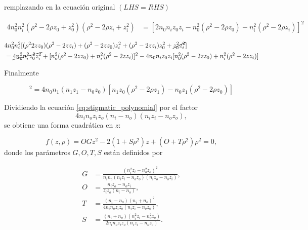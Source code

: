 remplazando en la ecuación original $(LHS = RHS)$


\begin{equation}
\begin{aligned}
4 n_0^2 n_i^2 (\rho^2 - 2\rho z_0 + z_0^2)(\rho^2 - 2\rho z_i + z_i^2)
&= [ 2 n_0 n_i z_0 z_i 
- n_0^2 (\rho^2 - 2\rho z_0)
- n_i^2 (\rho^2 - 2\rho z_i) ]^2
\end{aligned}
\end{equation}

\begin{equation}
\begin{aligned}
&4n_0^2n_i^2[(\rho^2 2zz_0)(\rho^2 - 2zz_i) + (\rho^2 - 2zz_0)z_i^2 + (\rho^2 - 2zz_i)z_0^2 + \cancel{z_0^2z_i^2}  ] 
\\
&= \cancel{4n_0^2n_i^2z_0^2z_i^2} + [n_o^2(\rho^2  - 2zz_0) + n_i^2(\rho^ 2 - 2zz_i)]^2 - 4n_0n_iz_0z_i [n_0^2 (\rho^2 - 2zz_0) + n_i^2(\rho^2 - 2zz_i)]
\end{aligned}
\end{equation}




Finalmente


\begin{equation}
[n_0^2(\rho^2-2\rho z_0) - n_1^2(\rho^2-2\rho z_1)]^2 = 4n_0n_1(n_1z_1-n_0z_0)[n_1z_0(\rho^2-2\rho z_1) - n_0z_1(\rho^2-2\rho z_0)]  
\label{eq:stigmatic_polynomial}
\end{equation}



Dividiendo la ecuación \eqref{eq:stigmatic_polynomial} por el factor
\[
4n_i n_o z_i z_o (n_i - n_o)(n_i z_i - n_o z_o),
\]
se obtiene una forma cuadrática en $z$:

\begin{equation}
f(z, \rho) = O G z^2 - 2(1 + S\rho^2)z + (O + T\rho^2)\rho^2 = 0,
\label{eq:stigmatic_canonical}
\end{equation}
donde los parámetros $G, O, T, S$ están definidos por

\begin{align}
G &= \frac{(n_i^2 z_i - n_o^2 z_o)^2}{n_i n_o (n_i z_i - n_o z_o)(n_i z_o - n_o z_i)}, \label{eq:def_G} \\
O &= \frac{n_i z_o - n_o z_i}{z_i z_o (n_i - n_o)}, \label{eq:def_O} \\
T &= \frac{(n_i - n_o)(n_i + n_o)^2}{4n_i n_o z_i z_o (n_i z_i - n_o z_o)}, \label{eq:def_T} \\
S &= \frac{(n_i + n_o)(n_i^2 z_i - n_o^2 z_o)}{2n_i n_o z_i z_o (n_i z_i - n_o z_o)}. \label{eq:def_S}
\end{align}






